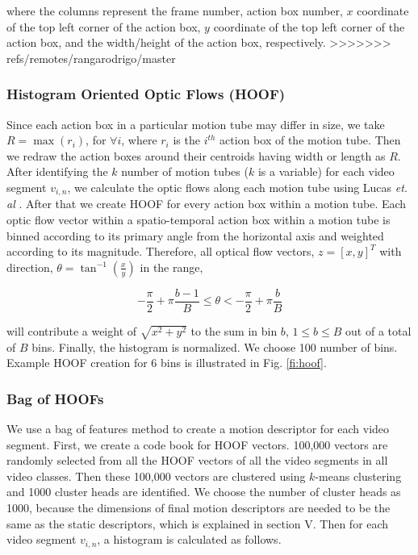 where the columns represent the frame number, action box number, $x$ coordinate of the top left corner of the action box,
$y$ coordinate of the top left corner of the action box, and the width/height of the action box, respectively.
>>>>>>> refs/remotes/rangarodrigo/master

\subsubsection{Histogram Oriented Optic Flows (HOOF)}
Since each action box in a particular motion tube may differ in size, we take $R = \max(r_{i})$, for $\forall{i}$,
where $r_{i}$ is the $i^{th}$ action box of the motion tube. Then we redraw the action boxes around their centroids having width or length as $R$.
After identifying the $k$ number of motion tubes ($k$ is a variable) for each video segment $v_{i,n}$, we calculate the optic flows along each motion tube
using Lucas \textit{et. al} \cite{lucas1981iterative}.
After that we create HOOF\cite{chaudhry2009histograms} for every
    action box within a motion tube. Each optic flow vector within a spatio-temporal action box within a motion tube is binned according
    to its primary angle from the horizontal axis and weighted according to its magnitude.  Therefore, all optical flow vectors, $z=[x,y]^T$ with direction,
$\theta = \tan^{-1}(\frac{x}{y})$ in the range,

\begin{equation}
- \frac{\pi}{2} + \pi\frac{b-1}{B} \leq \theta < -\frac{\pi}{2} + \pi\frac{b}{B}
\end{equation}

will contribute a weight of $\sqrt{x^2 + y^2}$ to the sum in bin $b$, $1 \leq b \leq B$ out of a total of
$B$ bins. Finally, the histogram is normalized. We choose 100 number of bins. Example HOOF creation for 6 bins is illustrated in Fig. \ref{fi:hoof}.

\subsubsection{Bag of HOOFs}
We use a bag of features method to create a motion descriptor for each video segment. First, we create a code book for HOOF vectors.
100,000 vectors are randomly selected from all the HOOF vectors of all the video segments in all video classes.
Then these 100,000 vectors are clustered using $k$-means clustering and 1000 cluster heads
are identified. We choose the number of cluster heads as 1000, because the dimensions of final motion descriptors are needed to be the same as
the static descriptors, which is explained in section V. Then for each video segment $v_{i,n}$, a histogram is calculated as follows.


